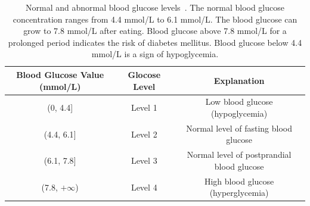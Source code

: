 \begin{table}[h]
  \centering
  \caption{Normal and abnormal blood glucose levels~\cite{bib:BGWiKi}. The normal blood glucose concentration ranges from 4.4 mmol/L to 6.1 mmol/L. The blood glucose can grow to 7.8 mmol/L after eating. Blood glucose above 7.8 mmol/L for a prolonged period indicates the risk of diabetes mellitus. Blood glucose below 4.4 mmol/L is a sign of hypoglycemia.}
  \label{tab:blood_glucose_levels}
  \begin{tabular}{|c|c|c|}
  \hline
  \textbf{Blood Glucose Value (mmol/L)} & \textbf{Glocose Level} & \textbf{Explanation}                      \\ \hline
  (0, 4.4{]}                            & Level 1                & Low blood glucose (hypoglycemia)         \\ \hline
  (4.4, 6.1{]}                          & Level 2                & Normal level of fasting blood glucose      \\ \hline
  (6.1, 7.8{]}                          & Level 3                & Normal level of postprandial blood glucose \\ \hline
  (7.8, $+\infty$)                      & Level 4                & High blood glucose (hyperglycemia)          \\ \hline
  \end{tabular}
\end{table}




